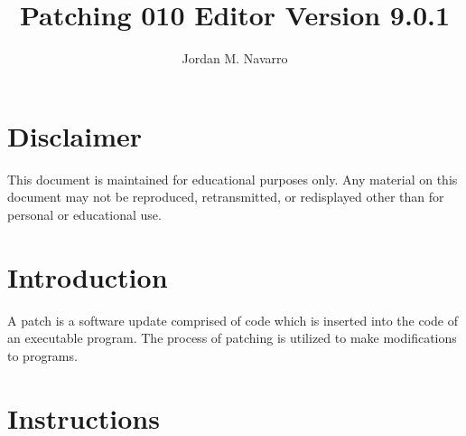 \documentclass[12pt]{article}
\title{Patching 010 Editor Version 9.0.1}
\author{Jordan M. Navarro}
\date{}
\begin{document}
\maketitle

\section{Disclaimer}

This document is maintained for educational purposes only. Any material on this document may not be reproduced, retransmitted, or redisplayed other than for personal or educational use.

\section{Introduction}

A patch is a software update comprised of code which is inserted into the code of an executable program. The process of patching is utilized to make modifications to programs.

\section{Instructions}
\end{document}
